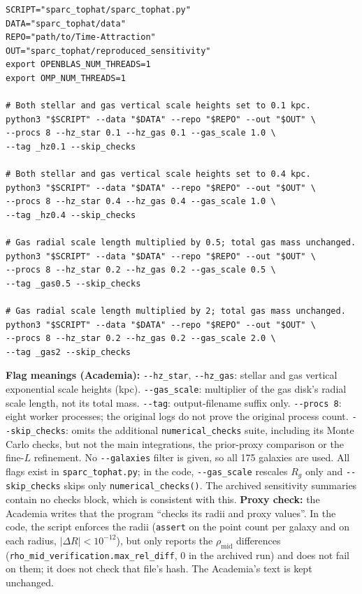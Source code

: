 \documentclass[10pt,a4paper]{article}
\begin{document}
\par\noindent\begin{minipage}{\textwidth}\scriptsize
\begin{verbatim}
SCRIPT="sparc_tophat/sparc_tophat.py"
DATA="sparc_tophat/data"
REPO="path/to/Time-Attraction"
OUT="sparc_tophat/reproduced_sensitivity"
export OPENBLAS_NUM_THREADS=1
export OMP_NUM_THREADS=1

# Both stellar and gas vertical scale heights set to 0.1 kpc.
python3 "$SCRIPT" --data "$DATA" --repo "$REPO" --out "$OUT" \
--procs 8 --hz_star 0.1 --hz_gas 0.1 --gas_scale 1.0 \
--tag _hz0.1 --skip_checks

# Both stellar and gas vertical scale heights set to 0.4 kpc.
python3 "$SCRIPT" --data "$DATA" --repo "$REPO" --out "$OUT" \
--procs 8 --hz_star 0.4 --hz_gas 0.4 --gas_scale 1.0 \
--tag _hz0.4 --skip_checks

# Gas radial scale length multiplied by 0.5; total gas mass unchanged.
python3 "$SCRIPT" --data "$DATA" --repo "$REPO" --out "$OUT" \
--procs 8 --hz_star 0.2 --hz_gas 0.2 --gas_scale 0.5 \
--tag _gas0.5 --skip_checks

# Gas radial scale length multiplied by 2; total gas mass unchanged.
python3 "$SCRIPT" --data "$DATA" --repo "$REPO" --out "$OUT" \
--procs 8 --hz_star 0.2 --hz_gas 0.2 --gas_scale 2.0 \
--tag _gas2 --skip_checks
\end{verbatim}
\end{minipage}

\vspace{-2pt}\noindent\textbf{Flag meanings (Academia):} \texttt{-{}-hz\_star}, \texttt{-{}-hz\_gas}: stellar and gas vertical exponential scale heights (kpc). \texttt{-{}-gas\_scale}: multiplier of the gas disk's radial scale length, not its total mass. \texttt{-{}-tag}: output-filename suffix only. \texttt{-{}-procs 8}: eight worker processes; the original logs do not prove the original process count. \texttt{-{}-skip\_checks}: omits the additional \texttt{numerical\_checks} suite, including its Monte Carlo checks, but not the main integrations, the prior-proxy comparison or the fine-$L$ refinement. No \texttt{-{}-galaxies} filter is given, so all 175 galaxies are used. All flags exist in \texttt{sparc\_tophat.py}; in the code, \texttt{-{}-gas\_scale} rescales $R_g$ only and \texttt{-{}-skip\_checks} skips only \texttt{numerical\_checks()}. The archived sensitivity summaries contain no checks block, which is consistent with this. \textbf{Proxy check:} the Academia writes that the program ``checks its radii and proxy values''. In the code, the script enforces the radii (\texttt{assert} on the point count per galaxy and on each radius, $|\Delta R|<10^{-12}$), but only reports the $\rho_\mathrm{mid}$ differences (\texttt{rho\_mid\_verification.max\_rel\_diff}, 0 in the archived run) and does not fail on them; it does not check that file's hash. The Academia's text is kept unchanged.
\end{document}
